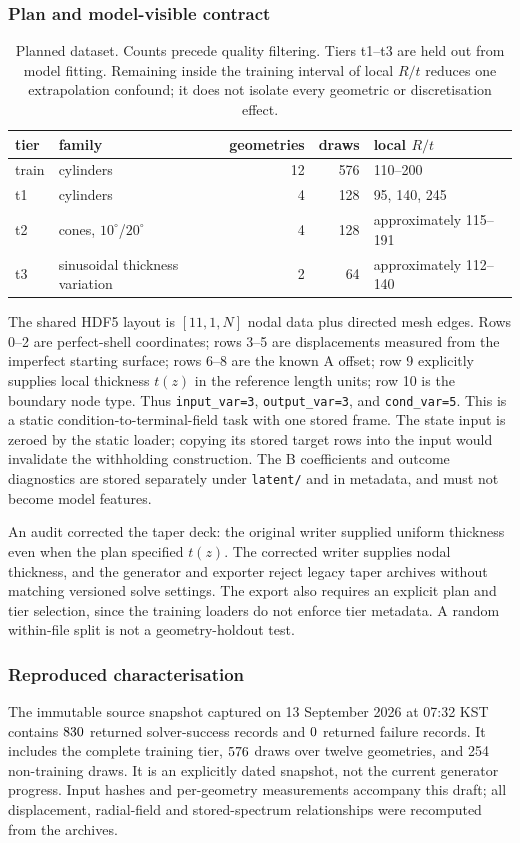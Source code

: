 \subsubsection{Plan and model-visible contract}
\begin{table}[tbp]
\centering
\caption{Planned dataset. Counts precede quality filtering. Tiers t1--t3 are
held out from model fitting. Remaining inside the training interval of local
$R/t$ reduces one extrapolation confound; it does not isolate every geometric
or discretisation effect.}
\label{tab:buckling-tiers}
\begin{tabular}{llrrl}
\toprule
tier & family & geometries & draws & local $R/t$ \\
\midrule
train & cylinders & 12 & 576 & 110--200 \\
t1 & cylinders & 4 & 128 & 95, 140, 245 \\
t2 & cones, $10^\circ$/$20^\circ$ & 4 & 128 & approximately 115--191 \\
t3 & sinusoidal thickness variation & 2 & 64 & approximately 112--140 \\
\bottomrule
\end{tabular}
\end{table}

The shared HDF5 layout is $[11,1,N]$ nodal data plus directed mesh edges.
Rows 0--2 are perfect-shell coordinates; rows 3--5 are displacements measured
from the imperfect starting surface; rows 6--8 are the known A offset;
row 9 explicitly supplies local thickness $t(z)$ in the reference length
units; row 10 is the boundary node type. Thus \texttt{input\_var=3},
\texttt{output\_var=3}, and \texttt{cond\_var=5}. This is a static
condition-to-terminal-field task with one stored frame. The state input is
zeroed by the static loader; copying its stored target rows into the input
would invalidate the withholding construction. The B coefficients and
outcome diagnostics are stored separately under \texttt{latent/} and in
metadata, and must not become model features.

An audit corrected the taper deck: the original writer supplied uniform
thickness even when the plan specified $t(z)$. The corrected writer supplies
nodal thickness, and the generator and exporter reject legacy taper archives
without matching versioned solve settings. The export also requires an
explicit plan and tier selection, since the training loaders do not enforce
tier metadata. A random within-file split is not a geometry-holdout test.

\subsubsection{Reproduced characterisation}
The immutable source snapshot captured on 13 September 2026 at 07:32 KST
contains $830$ returned solver-success records and
$0$ returned failure records. It includes the complete
training tier, $576$ draws over twelve geometries, and 254
non-training draws. It is an explicitly dated snapshot, not the current
generator progress. Input hashes and per-geometry measurements accompany
this draft; all displacement, radial-field and stored-spectrum relationships
were recomputed from the archives.

